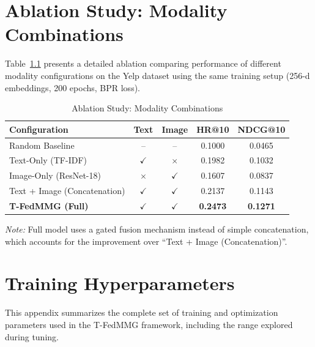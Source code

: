 \documentclass[12pt,a4paper]{report}
\begin{document}
{%
\chapter{Ablation Study: Modality Combinations}
\label{appendix:ablation}

Table~\ref{tab:modality_comparison} presents a detailed ablation comparing performance of different modality configurations on the Yelp dataset using the same training setup (256-d embeddings, 200 epochs, BPR loss).

\begin{table}[htbp]
\centering
\small
\caption{Ablation Study: Modality Combinations}
\label{tab:modality_comparison}
\begin{tabular}{lcccc}
\toprule
\textbf{Configuration} & \textbf{Text} & \textbf{Image} & \textbf{HR@10} & \textbf{NDCG@10} \\
\midrule
Random Baseline              & --           & --           & 0.1000 & 0.0465 \\
Text-Only (TF-IDF)           & $\checkmark$ & $\times$     & 0.1982 & 0.1032 \\
Image-Only (ResNet-18)       & $\times$     & $\checkmark$ & 0.1607 & 0.0837 \\
Text + Image (Concatenation) & $\checkmark$ & $\checkmark$ & 0.2137 & 0.1143 \\
\midrule
\textbf{T-FedMMG (Full)}     & $\checkmark$ & $\checkmark$ & \textbf{0.2473} & \textbf{0.1271} \\
\bottomrule
\end{tabular}
\end{table}

\vspace{0.5em}
\textit{Note:} Full model uses a gated fusion mechanism instead of simple concatenation, which accounts for the improvement over ``Text + Image (Concatenation)''.

\chapter{Training Hyperparameters}
\label{appendix:hyperparameters}

This appendix summarizes the complete set of training and optimization parameters used in the T-FedMMG framework, including the range explored during tuning.

}
\end{document}
